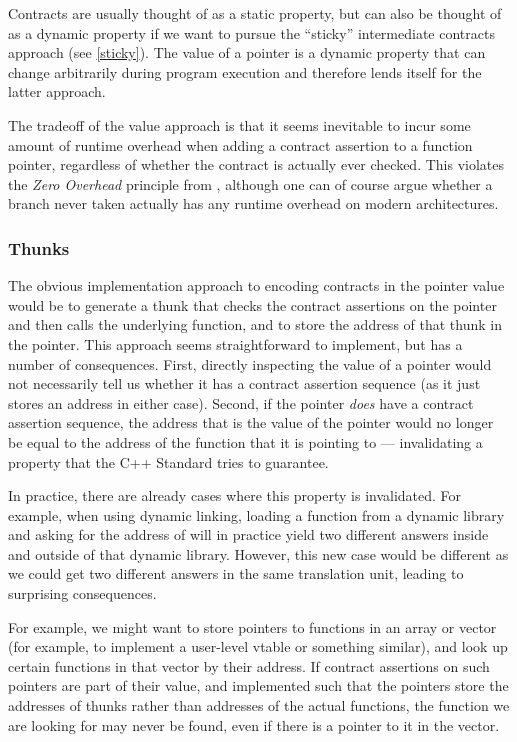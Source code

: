 Contracts are usually thought of as a static property, but can also be thought of as a dynamic property if we want to pursue the ``sticky'' intermediate contracts approach (see \ref{sticky}). The value of a pointer is a dynamic property that can change arbitrarily during program execution and therefore lends itself for the latter approach. 

The tradeoff of the value approach is that it seems inevitable to incur some amount of runtime overhead when adding a contract assertion to a function pointer, regardless of whether the contract is actually ever checked. This violates the \emph{Zero Overhead} principle from \cite{P2900R8}, although one can of course argue whether a branch never taken actually has any runtime overhead on modern architectures. 

\subsubsection{Thunks}

The obvious implementation approach to encoding contracts in the pointer value would be to generate a thunk that checks the contract assertions on the pointer and then calls the underlying function, and to store the address of that thunk in the pointer. This approach seems straightforward to implement, but has a number of consequences. First, directly inspecting the value of a pointer would not necessarily tell us whether it has a contract assertion sequence (as it just stores an address in either case). Second, if the pointer \emph{does} have a contract assertion sequence, the address that is the value of the pointer would no longer be equal to the address of the function that it is pointing to --- invalidating a property that the C++ Standard tries to guarantee.

In practice, there are already cases where this property is invalidated. For example, when using dynamic linking, loading a function  from a dynamic library and asking for the address of  will in practice yield two different answers inside and outside of that dynamic library. However, this new case would be different as we could get two different answers in the same translation unit, leading to surprising consequences.

For example, we might want to store pointers to functions in an array or vector (for example, to implement a user-level vtable or something similar), and look up certain functions in that vector by their address. If contract assertions on such pointers are part of their value, and implemented such that the pointers store the addresses of thunks rather than addresses of the actual functions, the function we are looking for may never be found, even if there is a pointer to it in the vector.

